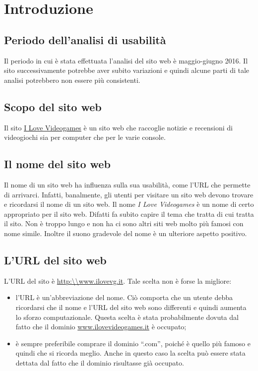 \documentclass[../ProgettoTecWeb2.tex]{subfiles}
\begin{document}
\section{Introduzione}
	\subsection{Periodo dell'analisi di usabilità}
	Il periodo in cui è stata effettuata l'analisi del sito web è maggio-giugno 2016. Il sito successivamente potrebbe aver subito variazioni e quindi alcune parti di tale analisi potrebbero non essere più consistenti.

	\subsection{Scopo del sito web}
	Il sito \href{http://ilovevg.it/}{I Love Videogames} è un sito web che raccoglie notizie e  recensioni di videogiochi sia per computer che per le varie console.

	\subsection{Il nome del sito web}
	Il nome di un sito web ha influenza sulla sua usabilità, come l'URL che permette di arrivarci. Infatti, banalmente, gli utenti per visitare un sito web devono trovare e ricordarsi il nome di un sito web. Il nome \textit{I Love Videogames} è un nome di certo appropriato per il sito web. Difatti fa subito capire il tema che tratta di cui tratta il sito. Non è troppo lungo e non ha ci sono altri siti web molto più famosi con nome simile. Inoltre il suono gradevole del nome è un ulteriore aspetto positivo.

	\subsection{L'URL del sito web}
	L'URL del sito è \url{http:\\www.ilovevg.it}. Tale scelta non è forse la migliore:
	\begin{itemize}
		\item l'URL è un'abbreviazione del nome. Ciò comporta che un utente debba ricordarsi che il nome e l'URL del sito web sono differenti e quindi aumenta lo sforzo computazionale. Questa scelta è stata probabilmente dovuta dal fatto che il dominio \url{www.ilovevideogames.it} è occupato;
		\item è sempre preferibile comprare il dominio ``.com'', poiché è quello più famoso e quindi che si ricorda meglio. Anche in questo caso la scelta può essere stata dettata dal fatto che il dominio risultasse già occupato.
	\end{itemize}
\end{document}
